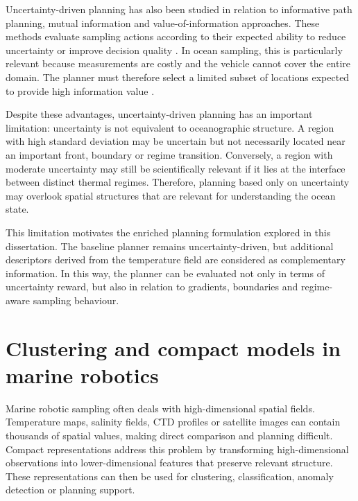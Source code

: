 Uncertainty-driven planning has also been studied in relation to informative path planning, mutual information and value-of-information approaches. These methods evaluate sampling actions according to their expected ability to reduce uncertainty or improve decision quality \parencite{krause2008sensorplacement,hollinger2014informationgathering,binney2010informative}. In ocean sampling, this is particularly relevant because measurements are costly and the vehicle cannot cover the entire domain. The planner must therefore select a limited subset of locations expected to provide high information value \parencite{binney2013waypoints,eidsvik2015value,frolov2014grid}.

Despite these advantages, uncertainty-driven planning has an important limitation: uncertainty is not equivalent to oceanographic structure. A region with high standard deviation may be uncertain but not necessarily located near an important front, boundary or regime transition. Conversely, a region with moderate uncertainty may still be scientifically relevant if it lies at the interface between distinct thermal regimes. Therefore, planning based only on uncertainty may overlook spatial structures that are relevant for understanding the ocean state.

This limitation motivates the enriched planning formulation explored in this dissertation. The baseline planner remains uncertainty-driven, but additional descriptors derived from the temperature field are considered as complementary information. In this way, the planner can be evaluated not only in terms of uncertainty reward, but also in relation to gradients, boundaries and regime-aware sampling behaviour.

\section{Clustering and compact models in marine robotics} \label{sec:rw_clustering_compact_models}

Marine robotic sampling often deals with high-dimensional spatial fields. Temperature maps, salinity fields, CTD profiles or satellite images can contain thousands of spatial values, making direct comparison and planning difficult. Compact representations address this problem by transforming high-dimensional observations into lower-dimensional features that preserve relevant structure. These representations can then be used for clustering, classification, anomaly detection or planning support.

